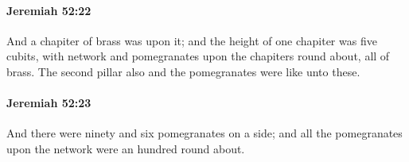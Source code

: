 		\paragraph{Jeremiah 52:22} %
			\label{JEREMIAH-52-22}

			And a chapiter of brass was upon it; and the height of one chapiter was five cubits, with network and pomegranates upon the chapiters round about, all of brass. The second pillar also and the pomegranates were like unto these.


		\paragraph{Jeremiah 52:23} %
			\label{JEREMIAH-52-23}

			And there were ninety and six pomegranates on a side; and all the pomegranates upon the network were an hundred round about.


